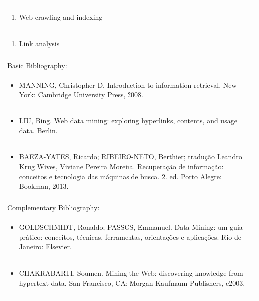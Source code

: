 \documentclass[11pt]{article}
\begin{document}
\begin{center}
\begin{longtable}{|p{4cm}|p{4cm}|p{4cm}|p{4cm}|}
\multicolumn{4}{|p{\dimexpr 16cm + 6\tabcolsep\relax}|}{\begin{enumerate}[start=12]\item Web crawling and indexing\end{enumerate}}\\
\multicolumn{4}{|p{\dimexpr 16cm + 6\tabcolsep\relax}|}{\begin{enumerate}[start=13]\item Link analysis\end{enumerate}}\\
\multicolumn{4}{|p{\dimexpr 16cm + 6\tabcolsep\relax}|}{}\\
\hline
\multicolumn{4}{|p{16cm}|}{Basic Bibliography:}\\*
\multicolumn{4}{|p{\dimexpr 16cm + 6\tabcolsep\relax}|}{\begin{itemize}\item MANNING, Christopher D. Introduction to information retrieval. New York: Cambridge University Press, 2008.\end{itemize}}\\
\multicolumn{4}{|p{\dimexpr 16cm + 6\tabcolsep\relax}|}{\begin{itemize}\item LIU, Bing. Web data mining: exploring hyperlinks, contents, and usage data. Berlin.\end{itemize}}\\
\multicolumn{4}{|p{\dimexpr 16cm + 6\tabcolsep\relax}|}{\begin{itemize}\item BAEZA-YATES, Ricardo; RIBEIRO-NETO, Berthier; tradução Leandro Krug Wives, Viviane Pereira Moreira. Recuperação de informação: conceitos e tecnologia das máquinas de busca. 2. ed. Porto Alegre: Bookman, 2013.\end{itemize}}\\
\multicolumn{4}{|p{16cm}|}{}\\
\hline
\multicolumn{4}{|p{16cm}|}{Complementary Bibliography:}\\*
\multicolumn{4}{|p{\dimexpr 16cm + 6\tabcolsep\relax}|}{\begin{itemize}\item GOLDSCHMIDT, Ronaldo; PASSOS, Emmanuel. Data Mining: um guia prático: conceitos, técnicas, ferramentas, orientações e aplicações. Rio de Janeiro: Elsevier.\end{itemize}}\\
\multicolumn{4}{|p{\dimexpr 16cm + 6\tabcolsep\relax}|}{\begin{itemize}\item CHAKRABARTI, Soumen. Mining the Web: discovering knowledge from hypertext data. San Francisco, CA: Morgan Kaufmann Publishers, c2003.\end{itemize}}\\

\end{longtable}
\end{center}
\end{document}
